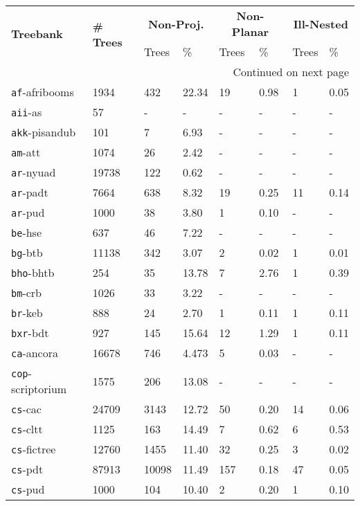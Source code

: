 \begin{longtable}{|l|l|l|l|l|l|l|l|}
    \hline 
    \multirow{2}{*}{\textbf{Treebank}} &
    \multirow{2}{*}{\textbf{\# Trees}} & 
    \multicolumn{2}{c|}{\textbf{Non-Proj.}} & 
    \multicolumn{2}{c|}{\textbf{Non-Planar}} & 
    \multicolumn{2}{c|}{\textbf{Ill-Nested}} \\
     & & Trees & \% & Trees & \% & Trees & \% \\
    \hline 
    \endhead
    \hline 
    \multicolumn{8}{|r|}{{Continued on next page}} \\ 
    \hline
    \endfoot
    \endlastfoot
    \hline
    \label{tab:allnpudv2.5}
\texttt{af}-afribooms & 1934 & 432 & 22.34 & 19 & 0.98 & 1 & 0.05\\
\texttt{aii}-as & 57 & - & - & - & - & - & -\\
\texttt{akk}-pisandub & 101 & 7 & 6.93 & - & - & - & -\\
\texttt{am}-att & 1074 & 26 & 2.42 & - & - & - & -\\
\texttt{ar}-nyuad & 19738 & 122 & 0.62 & - & - & - & -\\
\texttt{ar}-padt & 7664 & 638 & 8.32 & 19 & 0.25 & 11 & 0.14\\
\texttt{ar}-pud & 1000 & 38 & 3.80 & 1 & 0.10 & - & -\\
\texttt{be}-hse & 637 & 46 & 7.22 & - & - & - & -\\
\texttt{bg}-btb & 11138 & 342 & 3.07 & 2 & 0.02 & 1 & 0.01\\
\texttt{bho}-bhtb & 254 & 35 & 13.78 & 7 & 2.76 & 1 & 0.39\\
\texttt{bm}-crb & 1026 & 33 & 3.22 & - & - & - & -\\
\texttt{br}-keb & 888 & 24 & 2.70 & 1 & 0.11 & 1 & 0.11\\
\texttt{bxr}-bdt & 927 & 145 & 15.64 & 12 & 1.29 & 1 & 0.11\\
\texttt{ca}-ancora & 16678 & 746 & 4.473 & 5 & 0.03 & - & -\\
\texttt{cop}-scriptorium & 1575 & 206 & 13.08 & - & - & - & -\\
\texttt{cs}-cac & 24709 & 3143 & 12.72 & 50 & 0.20 & 14 & 0.06\\
\texttt{cs}-cltt & 1125 & 163 & 14.49 & 7 & 0.62 & 6 & 0.53\\
\texttt{cs}-fictree & 12760 & 1455 & 11.40 & 32 & 0.25 & 3 & 0.02\\
\texttt{cs}-pdt & 87913 & 10098 & 11.49 & 157 & 0.18 & 47 & 0.05\\
\texttt{cs}-pud & 1000 & 104 & 10.40 & 2 & 0.20 & 1 & 0.10\\

\end{longtable}

